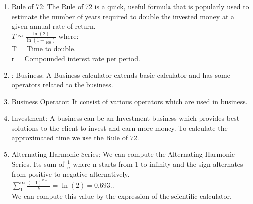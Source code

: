 \documentclass{article}
\begin{document}
\begin{enumerate}
    \item Rule of 72: The Rule of 72 is a quick, useful formula that is popularly used to estimate the number of years required to double the invested money at a given annual rate of return. \\
    $T \simeq \frac{\ln(2)}{\ln(1+\frac{r}{100})}$
    where: \\
    T = Time to double. \\
    r = Compounded interest rate per period.
    \item: Business: A Business calculator extends basic calculator and has some operators related to the business.
    \item Business Operator: It consist of various operators which are used in business.
    \item Investment: A business can be an Investment business which provides best solutions to the client to invest and earn more money. To calculate the approximated time we use the Rule of 72.
    \item Alternating Harmonic Series: We can compute the Alternating Harmonic Series. Its sum of $\frac{1}{n}$ where n starts from 1 to infinity and the sign alternates from positive to negative alternatively. \\
    $\sum_1^\infty{\frac{(-1)^{k+1}}{k}} = \ln(2) = 0.693..$ \\
    We can compute this value by the expression of the scientific calculator.
\end{enumerate}
\end{document}
